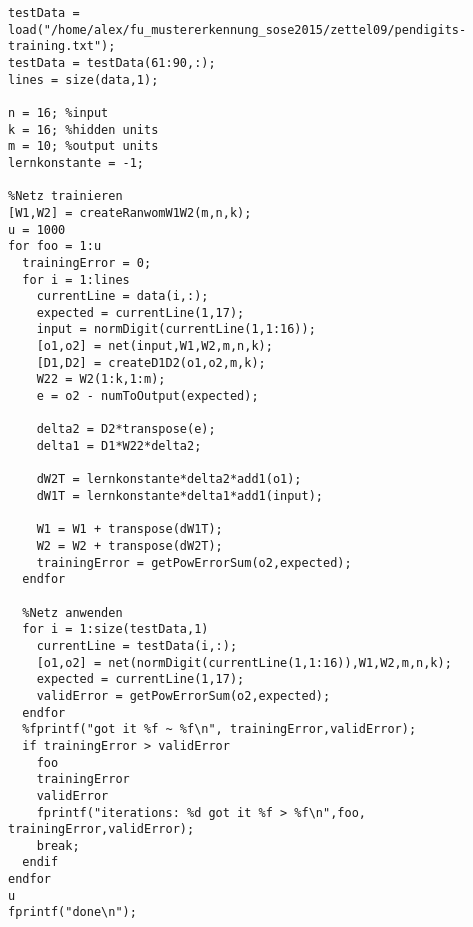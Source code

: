 \documentclass[a4paper,10pt]{article}
\begin{document}
\begin{lstlisting}
testData = load("/home/alex/fu_mustererkennung_sose2015/zettel09/pendigits-training.txt");
testData = testData(61:90,:);
lines = size(data,1);

n = 16; %input
k = 16; %hidden units
m = 10; %output units
lernkonstante = -1;

%Netz trainieren
[W1,W2] = createRanwomW1W2(m,n,k);
u = 1000
for foo = 1:u
  trainingError = 0;
  for i = 1:lines
    currentLine = data(i,:);
    expected = currentLine(1,17);
    input = normDigit(currentLine(1,1:16));
    [o1,o2] = net(input,W1,W2,m,n,k);
    [D1,D2] = createD1D2(o1,o2,m,k);
    W22 = W2(1:k,1:m);
    e = o2 - numToOutput(expected);
    
    delta2 = D2*transpose(e);
    delta1 = D1*W22*delta2;
    
    dW2T = lernkonstante*delta2*add1(o1);
    dW1T = lernkonstante*delta1*add1(input);

    W1 = W1 + transpose(dW1T);
    W2 = W2 + transpose(dW2T);
    trainingError = getPowErrorSum(o2,expected);
  endfor
  
  %Netz anwenden
  for i = 1:size(testData,1)
    currentLine = testData(i,:);
    [o1,o2] = net(normDigit(currentLine(1,1:16)),W1,W2,m,n,k);
    expected = currentLine(1,17);
    validError = getPowErrorSum(o2,expected);
  endfor
  %fprintf("got it %f ~ %f\n", trainingError,validError);
  if trainingError > validError
    foo
    trainingError
    validError
    fprintf("iterations: %d got it %f > %f\n",foo, trainingError,validError);
    break;
  endif
endfor
u
fprintf("done\n");
\end{lstlisting}
\end{document}
